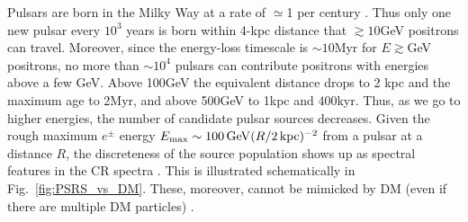 \documentclass[aps,prd,twocolumn,amsmath,superscriptaddress,amssymb,showpacs,floatfix,nofootinbib]{revtex4-1}
\begin{document}
Pulsars are born in the Milky Way at a rate of $\simeq$1 per
century \cite{1999MNRAS.302..693D, Vranesevic:2003tp,
FaucherGiguere:2005ny, Lorimer:2006qs, Keane:2008jj}.  Thus
only one new pulsar every $10^{3}$ years is born within 
4-kpc distance that $\gtrsim10$GeV positrons can travel.
Moreover, since the energy-loss timescale is $\sim10$Myr
for $E\gtrsim$GeV positrons, no more than $\sim10^{4}$ pulsars
can contribute positrons with energies above a few GeV.
Above 100GeV the equivalent distance drops to 2 kpc and the maximum age to
2Myr, and above 500GeV to 1kpc and 400kyr.  
Thus, as we go to higher energies, the number of candidate
pulsar sources decreases.  Given the rough maximum $e^\pm$ energy
$E_{\rm max} \sim 100\, {\rm GeV} (R/2\,{\rm kpc})^{-2}$ from a
pulsar at a distance $R$, the discreteness of the source
population shows up as spectral features in the CR spectra
\cite{Malyshev:2009tw,Grasso:2009ma}. This is illustrated schematically 
in Fig.~\ref{fig:PSRS_vs_DM}. These, moreover, cannot
be mimicked by DM (even if there are multiple DM
particles) \cite{Cholis:2009va, Dienes:2013xff}.
\end{document}
